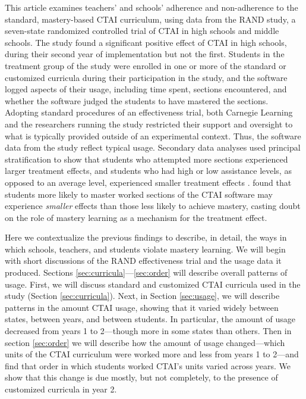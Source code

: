\documentclass[12pt]{article}\usepackage[]{graphicx}\usepackage[]{color}
\begin{document}
This article examines teachers' and schools' adherence and
non-adherence to the standard, mastery-based CTAI curriculum, using
data from the RAND study, a seven-state randomized controlled trial of
CTAI in high schools and middle schools. The study found a significant
positive effect of CTAI in high schools, during their second year of
implementation but not the first. Students in the treatment group of
the study were enrolled in one or more of the standard or customized
curricula during their participation in the study, and the software
logged aspects of their usage, including time spent, sections
encountered, and whether the software judged the students to have
mastered the sections. Adopting standard procedures of an
effectiveness trial, both Carnegie Learning and the researchers
running the study restricted their support and oversight to what is
typically provided outside of an experimental context. Thus, the
software data from the study reflect typical usage. Secondary data analyses used principal stratification to show that students who attempted more sections experienced larger treatment effects, and students who had high or low assistance levels, as opposed to an average level, experienced smaller treatment effects \citep{sales2015exploring,sales2016student}.
\citet{sales2017role} found that students more likely to master worked
sections of the CTAI software may experience \emph{smaller} effects
than those less likely to achieve mastery, casting doubt on the role
of mastery learning as a mechanism for the treatment effect.

Here we contextualize the previous findings to describe, in detail, the ways
in which schools, teachers, and students violate mastery learning.
We will begin with short discussions of the RAND effectiveness trial and the usage
data it produced.
Sections \ref{sec:curricula}---\ref{sec:order} will describe overall
patterns of usage.
First, we will discuss standard and customized CTAI curricula used in
the study (Section \ref{sec:curricula}).
Next, in Section \ref{sec:usage}, we will describe patterns in the amount CTAI usage, showing that
it varied widely between states, between years, and between students.
In particular, the amount of usage decreased from years 1 to
2---though more in some states than others.
Then in section \ref{sec:order} we will describe how the amount of usage
changed---which units of the CTAI curriculum were worked more and less
from years 1 to 2---and find that order in which students worked
CTAI's units varied across years. We show that this change is due
mostly, but not completely, to the presence of customized curricula in
year 2.
\end{document}
